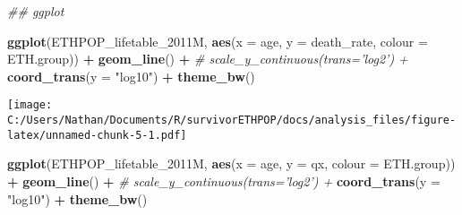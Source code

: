 \documentclass[
]{article}
\newenvironment{Shaded}{\begin{snugshade}}{\end{snugshade}}
\newcommand{\CommentTok}[1]{\textcolor[rgb]{0.56,0.35,0.01}{\textit{#1}}}
\newcommand{\DataTypeTok}[1]{\textcolor[rgb]{0.13,0.29,0.53}{#1}}
\newcommand{\DecValTok}[1]{\textcolor[rgb]{0.00,0.00,0.81}{#1}}
\newcommand{\KeywordTok}[1]{\textcolor[rgb]{0.13,0.29,0.53}{\textbf{#1}}}
\newcommand{\NormalTok}[1]{#1}
\newcommand{\OperatorTok}[1]{\textcolor[rgb]{0.81,0.36,0.00}{\textbf{#1}}}
\newcommand{\StringTok}[1]{\textcolor[rgb]{0.31,0.60,0.02}{#1}}
\begin{document}
\begin{Shaded}
\end{Shaded}

\begin{Shaded}
\begin{Highlighting}[]
\CommentTok{## ggplot}

\KeywordTok{ggplot}\NormalTok{(ETHPOP_lifetable_2011M, }\KeywordTok{aes}\NormalTok{(}\DataTypeTok{x =}\NormalTok{ age, }\DataTypeTok{y =}\NormalTok{ death_rate, }\DataTypeTok{colour =}\NormalTok{ ETH.group)) }\OperatorTok{+}
\StringTok{  }\KeywordTok{geom_line}\NormalTok{() }\OperatorTok{+}
\StringTok{  }\CommentTok{# scale_y_continuous(trans='log2') +}
\StringTok{  }\KeywordTok{coord_trans}\NormalTok{(}\DataTypeTok{y =} \StringTok{"log10"}\NormalTok{) }\OperatorTok{+}
\StringTok{  }\KeywordTok{theme_bw}\NormalTok{()}
\end{Highlighting}
\end{Shaded}

\texttt{[image: C:/Users/Nathan/Documents/R/survivorETHPOP/docs/analysis\_files/figure-latex/unnamed-chunk-5-1.pdf]}

\begin{Shaded}
\begin{Highlighting}[]
\KeywordTok{ggplot}\NormalTok{(ETHPOP_lifetable_2011M, }\KeywordTok{aes}\NormalTok{(}\DataTypeTok{x =}\NormalTok{ age, }\DataTypeTok{y =}\NormalTok{ qx, }\DataTypeTok{colour =}\NormalTok{ ETH.group)) }\OperatorTok{+}
\StringTok{  }\KeywordTok{geom_line}\NormalTok{() }\OperatorTok{+}
\StringTok{  }\CommentTok{# scale_y_continuous(trans='log2') +}
\StringTok{  }\KeywordTok{coord_trans}\NormalTok{(}\DataTypeTok{y =} \StringTok{"log10"}\NormalTok{) }\OperatorTok{+}
\StringTok{  }\KeywordTok{theme_bw}\NormalTok{()}
\end{Highlighting}
\end{Shaded}
\end{document}
